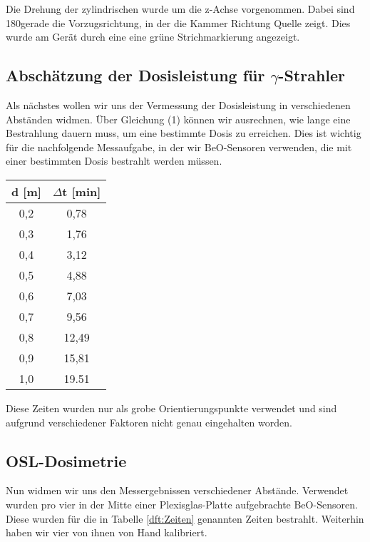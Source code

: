 Die Drehung der zylindrischen  wurde um die z-Achse vorgenommen. Dabei sind 180\textdegree gerade die Vorzugsrichtung, in der die Kammer Richtung Quelle zeigt. Dies wurde am Gerät durch eine eine grüne Strichmarkierung angezeigt.

\subsection{Abschätzung der Dosisleistung für $\gamma$-Strahler}

Als nächstes wollen wir uns der Vermessung der Dosisleistung in verschiedenen Abständen widmen. Über Gleichung (1) können wir ausrechnen, wie lange eine Bestrahlung dauern muss, um eine bestimmte Dosis zu erreichen. Dies ist wichtig für die nachfolgende Messaufgabe, in der wir BeO-Sensoren verwenden, die mit einer bestimmten Dosis bestrahlt werden müssen.

\vspace{5mm}
\minipanf
	\begin{center}
		\begin{tabular}{c|c}
				   \textbf{d} [m] & \textbf{$\Delta$t} [min] \\ 
		\hline     0,2 &  0,78 \\ 
				   0,3 &  1,76 \\ 
				   0,4 &  3,12 \\ 
				   0,5 &  4,88 \\ 
				   0,6 &  7,03 \\ 
				   0,7 &  9,56 \\ 
				   0,8 & 12,49 \\ 
				   0,9 & 15,81 \\ 
				   1,0 & 19.51 \\  
		\end{tabular}
		\label{dft:Zeiten} 
	\end{center}
\minipend
\vspace{5mm}

Diese Zeiten wurden nur als grobe Orientierungspunkte verwendet und sind aufgrund verschiedener Faktoren nicht genau eingehalten worden.

\subsection{OSL-Dosimetrie}
Nun widmen wir uns den Messergebnissen verschiedener Abstände. Verwendet wurden pro vier in der Mitte einer Plexisglas-Platte aufgebrachte BeO-Sensoren. Diese wurden für die in Tabelle \ref{dft:Zeiten} genannten Zeiten bestrahlt. Weiterhin haben wir vier von ihnen von Hand kalibriert.

